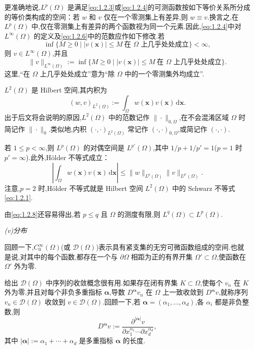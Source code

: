 更准确地说,\(L^p(\Omega)\) 是满足\eqref{eq:1.2.3}或\eqref{eq:1.2.4}的可测函数按如下等价关系所分成的等价类构成的空间：若 \(w\) 和 \(v\) 仅在一个零测集上有差异,则 \(w\equiv v\).换言之,在 \(L^p(\Omega)\) 中,仅在零测集上有差异的两个函数视为同一个元素.因此,\eqref{eq:1.2.4}中对 \(L^\infty(\Omega)\) 的定义及\eqref{eq:1.2.6}中的范数应作如下修改.若
\[
  \inf\bigl\{M\ge 0\mid |v(\boldsymbol{x})|\le M\ \text{在 \(\Omega\) 上几乎处处成立}\bigr\}<\infty,
\]
则 \(v\in L^\infty(\Omega)\),并且
\begin{equation}\label{eq:1.2.7}
  \|v\|_{L^\infty(\Omega)}
  :=\inf\bigl\{M\ge 0\mid |v(\boldsymbol{x})|\le M\ \text{在 \(\Omega\) 上几乎处处成立}\bigr\}.
\end{equation}
这里,“在 \(\Omega\) 上几乎处处成立”意为“除 \(\Omega\) 中的一个零测集外均成立”.

\(L^2(\Omega)\) 是 Hilbert 空间,其内积为
\[
  (w,v)_{L^2(\Omega)}:=\int_\Omega w(\boldsymbol{x})v(\boldsymbol{x})\,\mathrm d\boldsymbol{x}.
\]
出于后文将会说明的原因,\(L^2(\Omega)\) 中的范数记作 \(\|\cdot\|_{0,\Omega}\),在不会混淆区域 \(\Omega\) 时简记作 \(\|\cdot\|_0\).类似地,内积 \((\cdot,\cdot)_{L^2(\Omega)}\) 常记作 \((\cdot,\cdot)_{0,\Omega}\),或简记作 \((\cdot,\cdot)\).

若 \(1\le p<\infty\),则 \(L^p(\Omega)\) 的对偶空间是 \(L^{p'}(\Omega)\),其中 \(1/p+1/p'=1\)(\(p=1\) 时 \(p'=\infty\)).此外,Hölder 不等式成立：
\begin{equation}\label{eq:1.2.8}
  \left|\int_\Omega w(\boldsymbol{x})v(\boldsymbol{x})\,\mathrm d\boldsymbol{x}\right|
  \le \|w\|_{L^p(\Omega)}\|v\|_{L^{p'}(\Omega)}.
\end{equation}
注意,\(p=2\) 时,Hölder 不等式就是 Hilbert 空间 \(L^2(\Omega)\) 中的 Schwarz 不等式\eqref{eq:1.2.1}.

由\eqref{eq:1.2.8}还容易得出,若 \(p\le q\) 且 \(\Omega\) 的测度有限,则 \(L^q(\Omega)\subset L^p(\Omega)\).

\medskip
\noindent\textit{(v)分布}

回顾一下,\(C^\infty_0(\Omega)\)(或 \(\mathcal D(\Omega)\))表示具有紧支集的无穷可微函数组成的空间.也就是说,对其中的每个函数,都存在一个与 \(\partial\Omega\) 相距为正的有界开集 \(\Omega'\subset\Omega\),使函数在 \(\Omega'\) 外为零.

给出 \(\mathcal D(\Omega)\) 中序列的收敛概念很有用.如果存在闭有界集 \(K\subset\Omega\),使每个 \(v_n\) 在 \(K\) 外为零,并且对每个非负多重指标 \(\boldsymbol{\alpha}\),导数 \(D^{\boldsymbol{\alpha}}v_n\) 在 \(\Omega\) 上一致收敛到 \(D^{\boldsymbol{\alpha}}v\),就称序列 \(v_n\in\mathcal D(\Omega)\) 收敛到 \(v\in\mathcal D(\Omega)\).回顾一下,若 \(\boldsymbol{\alpha}=(\alpha_1,\ldots,\alpha_d)\),各 \(\alpha_i\) 都是非负整数,则
\[
  D^{\boldsymbol{\alpha}}v:=
  \frac{\partial^{|\boldsymbol{\alpha}|}v}
       {\partial x_1^{\alpha_1}\cdots\partial x_d^{\alpha_d}},
\]
其中 \(|\boldsymbol{\alpha}|:=\alpha_1+\cdots+\alpha_d\) 是多重指标 \(\boldsymbol{\alpha}\) 的长度.

